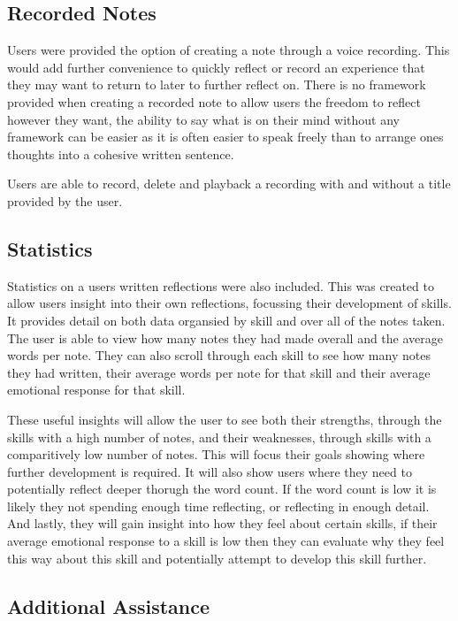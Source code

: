 \documentclass{l4proj}
\begin{document}
\subsection{Recorded Notes}

Users were provided the option of creating a note through a voice recording. This would add further convenience to quickly reflect or record an experience that they may want to return to later to further reflect on. There is no framework provided when creating a recorded note to allow users the freedom to reflect however they want, the ability to say what is on their mind without any framework can be easier as it is often easier to speak freely than to arrange ones thoughts into a cohesive written sentence. 

Users are able to record, delete and playback a recording with and without a title provided by the user. 

\subsection{Statistics}

Statistics on a users written reflections were also included. This was created to allow users insight into their own reflections, focussing their development of skills. It provides detail on both data organsied by skill and over all of the notes taken. The user is able to view how many notes they had made overall and the average words per note. They can also scroll through each skill to see how many notes they had written, their average words per note for that skill and their average emotional response for that skill. 

These useful insights will allow the user to see both their strengths, through the skills with a high number of notes, and their weaknesses, through skills with a comparitively low number of notes. This will focus their goals showing where further development is required. It will also show users where they need to potentially reflect deeper thorugh the word count. If the word count is low it is likely they not spending enough time reflecting, or reflecting in enough detail. And lastly, they will gain insight into how they feel about certain skills, if their average emotional response to a skill is low then they can evaluate why they feel this way about this skill and potentially attempt to develop this skill further.

\subsection{Additional Assistance}
\end{document}
